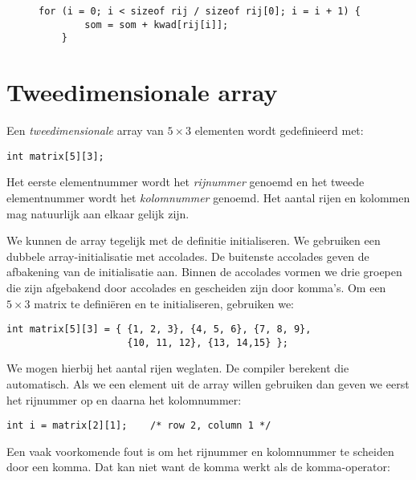 \begin{figure}[!ht]
\begin{lstlisting}[caption=Bepalen van het aantal elementen in een array.,label=cod:arrberekenensomrijkwadraten2]
    for (i = 0; i < sizeof rij / sizeof rij[0]; i = i + 1) {
        som = som + kwad[rij[i]];
    }
\end{lstlisting}
\end{figure}



\section{Tweedimensionale array}
Een \textsl{tweedimensionale} array van $5\times3$ elementen wordt gedefinieerd met:

\begin{lstlisting}[style=lstoneline]
int matrix[5][3];
\end{lstlisting}

Het eerste elementnummer wordt het \textsl{rijnummer} genoemd en het tweede elementnummer wordt het \textsl{kolomnummer} genoemd. Het aantal rijen en kolommen mag natuurlijk aan elkaar gelijk zijn.

We kunnen de array tegelijk met de definitie initialiseren. We gebruiken een dubbele array-initialisatie met accolades. De buitenste accolades geven de afbakening van de initialisatie aan. Binnen de accolades vormen we drie groepen die zijn afgebakend door accolades en gescheiden zijn door komma's. Om een $5\times3$ matrix te definiëren en te initialiseren, gebruiken we:

\begin{lstlisting}[style=lstoneline]
int matrix[5][3] = { {1, 2, 3}, {4, 5, 6}, {7, 8, 9},
                     {10, 11, 12}, {13, 14,15} };
\end{lstlisting}

We mogen hierbij het aantal rijen weglaten. De compiler berekent die automatisch. Als we een element uit de array willen gebruiken dan geven we eerst het rijnummer op en daarna het kolomnummer:

\begin{lstlisting}[style=lstoneline]
int i = matrix[2][1];    /* row 2, column 1 */
\end{lstlisting}

Een vaak voorkomende fout is om het rijnummer en kolomnummer te scheiden door een komma. Dat kan niet want de komma werkt als de komma-operator:

